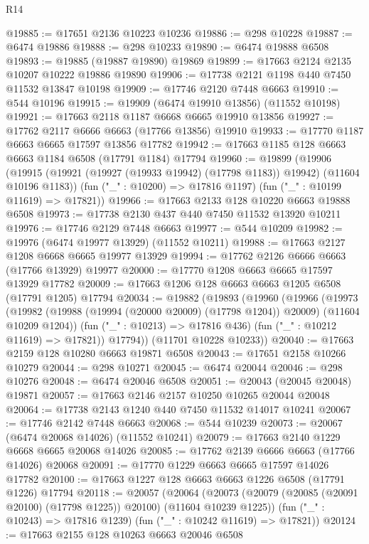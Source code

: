 \begin{lexlean}{R14}
\begin{coremodule}
{{{{{{{{{{{{{{{{{{{{{{{{{{{{{{{{{{{{{{{{{{{{{{{{{{{{{{{{{{{{{{{{{{{{{{{{{{{{{{{{{{@19885 := @17651 @2136 @10223 @10236
@19886 := @298 @10228
@19887 := @6474 @19886
@19888 := @298 @10233
@19890 := @6474 @19888 @6508
@19893 := @19885 (@19887 @19890) @19869
@19899 := @17663 @2124 @2135 @10207 @10222 @19886 @19890
@19906 := @17738 @2121 @1198 @440 @7450 @11532 @13847 @10198
@19909 := @17746 @2120 @7448 @6663
@19910 := @544 @10196
@19915 := @19909 (@6474 @19910 @13856) (@11552 @10198)
@19921 := @17663 @2118 @1187 @6668 @6665 @19910 @13856
@19927 := @17762 @2117 @6666 @6663 (@17766 @13856) @19910
@19933 := @17770 @1187 @6663 @6665 @17597 @13856 @17782
@19942 := @17663 @1185 @128 @6663 @6663 @1184 @6508 (@17791 @1184) @17794
@19960 := @19899
    (@19906
      (@19915 (@19921 (@19927 (@19933 @19942) (@17798 @1183)) @19942) (@11604 @10196 @1183))
      (fun ("_" : @10200) => @17816 @1197)
      (fun ("_" : @10199 @11619) => @17821))
@19966 := @17663 @2133 @128 @10220 @6663 @19888 @6508
@19973 := @17738 @2130 @437 @440 @7450 @11532 @13920 @10211
@19976 := @17746 @2129 @7448 @6663
@19977 := @544 @10209
@19982 := @19976 (@6474 @19977 @13929) (@11552 @10211)
@19988 := @17663 @2127 @1208 @6668 @6665 @19977 @13929
@19994 := @17762 @2126 @6666 @6663 (@17766 @13929) @19977
@20000 := @17770 @1208 @6663 @6665 @17597 @13929 @17782
@20009 := @17663 @1206 @128 @6663 @6663 @1205 @6508 (@17791 @1205) @17794
@20034 := @19882
    (@19893
      (@19960
        (@19966
          (@19973
            (@19982 (@19988 (@19994 (@20000 @20009) (@17798 @1204)) @20009) (@11604 @10209 @1204))
            (fun ("_" : @10213) => @17816 @436)
            (fun ("_" : @10212 @11619) => @17821))
          @17794))
      (@11701 @10228 @10233))
@20040 := @17663 @2159 @128 @10280 @6663 @19871 @6508
@20043 := @17651 @2158 @10266 @10279
@20044 := @298 @10271
@20045 := @6474 @20044
@20046 := @298 @10276
@20048 := @6474 @20046 @6508
@20051 := @20043 (@20045 @20048) @19871
@20057 := @17663 @2146 @2157 @10250 @10265 @20044 @20048
@20064 := @17738 @2143 @1240 @440 @7450 @11532 @14017 @10241
@20067 := @17746 @2142 @7448 @6663
@20068 := @544 @10239
@20073 := @20067 (@6474 @20068 @14026) (@11552 @10241)
@20079 := @17663 @2140 @1229 @6668 @6665 @20068 @14026
@20085 := @17762 @2139 @6666 @6663 (@17766 @14026) @20068
@20091 := @17770 @1229 @6663 @6665 @17597 @14026 @17782
@20100 := @17663 @1227 @128 @6663 @6663 @1226 @6508 (@17791 @1226) @17794
@20118 := @20057
    (@20064
      (@20073 (@20079 (@20085 (@20091 @20100) (@17798 @1225)) @20100) (@11604 @10239 @1225))
      (fun ("_" : @10243) => @17816 @1239)
      (fun ("_" : @10242 @11619) => @17821))
@20124 := @17663 @2155 @128 @10263 @6663 @20046 @6508
}}}}}}}}}}}}}}}}}}}}}}}}}}}}}}}}}}}}}}}}}}}}}}}}}}}}}}}}}}}}}}}}}}}}}}}}}}}}}}}}}}
\end{coremodule}
\end{lexlean}
